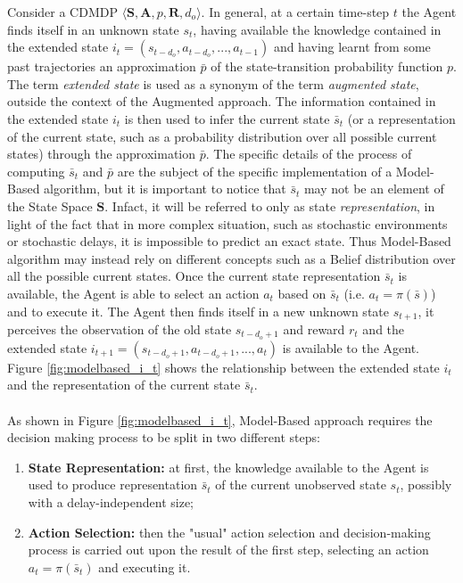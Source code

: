                 Consider a CDMDP $\langle \mathbf{S}, \mathbf{A}, p, \mathbf{R}, d_o\rangle$. In general, at a certain time-step $t$ the Agent finds itself in an unknown state $s_t$, having available the knowledge contained in the extended state $i_t = \left( s_{t-d_{o}}, a_{t-d_{o}}, ..., a_{t-1}\right)$ and having learnt from some past trajectories an approximation $\bar{p}$ of the state-transition probability function $p$. The term \textit{extended state} is used as a synonym of the term \textit{augmented state}, outside the context of the Augmented approach. The information contained in the extended state $i_t$ is then used to infer the current state $\bar{s}_t$ (or a representation of the current state, such as a probability distribution over all possible current states) through the approximation $\bar{p}$. The specific details of the process of computing $\bar{s}_t$ and $\bar{p}$ are the subject of the specific implementation of a Model-Based algorithm, but it is important to notice that $\bar{s}_t$ may not be an element of the State Space $\mathbf{S}$. Infact, it will be referred to only as state \textit{representation}, in light of the fact that in more complex situation, such as stochastic environments or stochastic delays, it is impossible to predict an exact state. Thus Model-Based algorithm may instead rely on different concepts such as a Belief distribution over all the possible current states. Once the current state representation $\bar{s}_t$ is available, the Agent is able to select an action $a_t$ based on $\bar{s}_t$ (i.e. $a_t = \pi\left(\bar{s}\right)$) and to execute it. The Agent then finds itself in a new unknown state $s_{t+1}$, it perceives the observation of the old state $s_{t-d_{o}+1}$ and reward $r_t$ and the extended state $i_{t+1} = \left( s_{t-d_{o}+1}, a_{t-d_{o}+1}, ..., a_{t}\right)$ is available to the Agent. Figure \ref{fig:modelbased_i_t} shows the relationship between the extended state $i_t$ and the representation of the current state $\bar{s}_t$.
                \\\\
                As shown in Figure \ref{fig:modelbased_i_t}, Model-Based approach requires the decision making process to be split in two different steps:
                \begin{enumerate}
                    \item\textbf{State Representation:} at first, the knowledge available to the Agent is used to produce representation $\bar{s}_t$ of the current unobserved state $s_t$, possibly with a delay-independent size; 
                    \item\textbf{Action Selection:} then the "usual" action selection and decision-making process is carried out upon the result of the first step, selecting an action $a_t = \pi(\bar{s}_t)$ and executing it.
                \end{enumerate}
